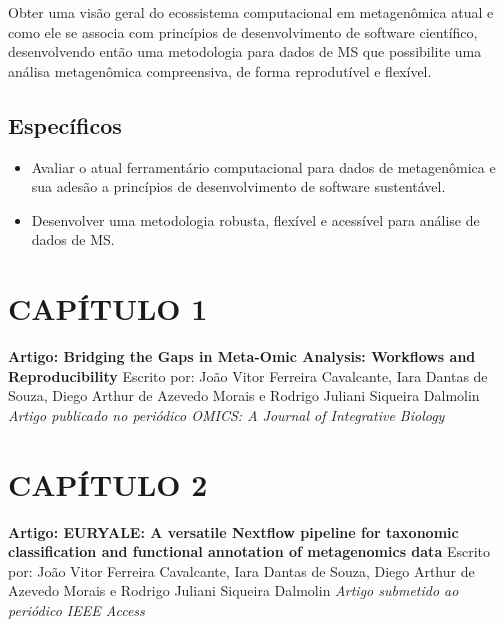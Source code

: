 \documentclass[
	12pt,				%
	oneside,			%
	a4paper,			%
	chapter=TITLE,		%
	section=TITLE,		%
	english,			%
	brazil				%
	]{abntex2}
\begin{document}
Obter uma visão geral do ecossistema computacional em metagenômica atual e como ele se associa
com princípios de desenvolvimento de software científico, desenvolvendo então uma metodologia
para dados de \gls{MS} que possibilite uma análisa metagenômica compreensiva, de forma reprodutível e flexível.

\section{Específicos}\label{especuxedficos}
\begin{itemize}
\tightlist
\item
  Avaliar o atual ferramentário computacional para dados de metagenômica e sua adesão a princípios de desenvolvimento de software sustentável.
\item
  Desenvolver uma metodologia robusta, flexível e acessível para análise de dados de \gls{MS}.
\end{itemize}
\chapter*{CAPÍTULO 1}\label{cap1}
\begin{center}
\textbf{Artigo: Bridging the Gaps in Meta-Omic Analysis: Workflows and Reproducibility}
\bigskip\newline
Escrito por: João Vitor Ferreira Cavalcante, Iara Dantas de Souza, Diego Arthur de Azevedo Morais e Rodrigo Juliani Siqueira Dalmolin
\bigskip\newline
\textit{Artigo publicado no periódico OMICS: A Journal of Integrative Biology}

\end{center}
\begin{fichacatalografica}
    
\end{fichacatalografica}
\chapter*{CAPÍTULO 2}\label{cap2}
\begin{center}
\textbf{Artigo: EURYALE: A versatile Nextflow pipeline for taxonomic classification and functional annotation of metagenomics data}
\bigskip\newline
Escrito por: João Vitor Ferreira Cavalcante, Iara Dantas de Souza, Diego Arthur de Azevedo Morais e Rodrigo Juliani Siqueira Dalmolin
\bigskip\newline
\textit{Artigo submetido ao periódico IEEE Access}

\end{center}
\begin{fichacatalografica}
    
\end{fichacatalografica}
\end{document}
